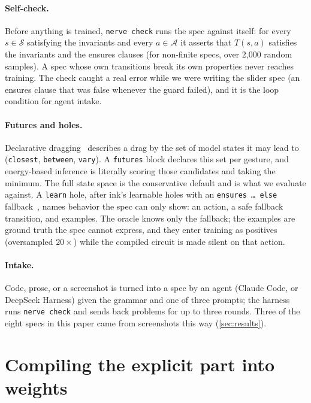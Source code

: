 \documentclass{article}
\theoremstyle{plain}
\theoremstyle{definition}
\theoremstyle{remark}
\newcommand{\Sset}{\mathcal{S}}
\newcommand{\Aset}{\mathcal{A}}
\begin{document}
\paragraph{Self-check.} Before anything is trained, \texttt{nerve check} runs the spec against itself: for every $s\in\Sset$ satisfying the invariants and every $a\in\Aset$ it asserts that $T(s,a)$ satisfies the invariants and the ensures clauses (for non-finite specs, over 2{,}000 random samples). A spec whose own transitions break its own properties never reaches training. The check caught a real error while we were writing the slider spec (an ensures clause that was false whenever the guard failed), and it is the loop condition for agent intake.

\paragraph{Futures and holes.} Declarative dragging~\citep{dragology} describes a drag by the set of model states it may lead to (\texttt{closest}, \texttt{between}, \texttt{vary}). A \texttt{futures} block declares this set per gesture, and energy-based inference is literally scoring those candidates and taking the minimum. The full state space is the conservative default and is what we evaluate against. A \texttt{learn} hole, after ink's learnable holes with an \texttt{ensures \dots{} else} fallback~\citep{inklang}, names behavior the spec can only show: an action, a safe fallback transition, and examples. The oracle knows only the fallback; the examples are ground truth the spec cannot express, and they enter training as positives (oversampled $20\times$) while the compiled circuit is made silent on that action.

\paragraph{Intake.} Code, prose, or a screenshot is turned into a spec by an agent (Claude Code, or DeepSeek Harness) given the grammar and one of three prompts; the harness runs \texttt{nerve check} and sends back problems for up to three rounds. Three of the eight specs in this paper came from screenshots this way (\cref{sec:results}).

\section{Compiling the explicit part into weights}
\label{sec:compile}
\end{document}
